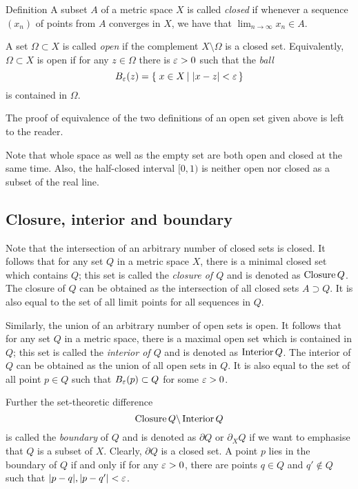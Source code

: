 \begin{thm}{Definition}
A subset $A$ of a metric space $X$ is called \emph{closed} if whenever a sequence $(x_n)$ of points from $A$ converges in $X$, we have that $\lim_{n\to\infty} x_n \in A$.

A set $\Omega \subset X$ is called \emph{open} if the complement $X \setminus \Omega$ is a closed set.
Equivalently, $\Omega \subset X$ is open if for any $z\in \Omega$ 
there is $\varepsilon>0$ such that the \emph{ball}
$$B_\eps(z)=\set{x\in X}{|x-z|<\eps}$$
is contained in $\Omega$.
\end{thm}


The proof of equivalence of the two definitions of an open set given above is left to the reader.

Note that whole space as well as the empty set are both open and closed at the same time.
Also, the half-closed interval $[0,1)$ is neither open nor closed as a subset of the real line.


\subsection*{Closure, interior and boundary}

Note that the intersection of an arbitrary number of closed sets is closed.
It follows that for any set $Q$ in a metric space $X$, there is a minimal closed set which contains $Q$;
this set is called the \emph{closure of $Q$} and is denoted as $\operatorname{Closure} Q$.
The closure of $Q$ can be obtained as the intersection of all closed sets $A\supset Q$.
It is also equal to the set of all limit points for all sequences in $Q$.


Similarly, the union of an arbitrary number of open sets is open.
It follows that for any set $Q$ in a metric space, there is a maximal open set which is contained in $Q$;
this set is called the \emph{interior of $Q$} and is denoted as $\operatorname{Interior} Q$.
The interior of $Q$ can be obtained as the union of all open sets in $Q$.
It is also equal to the set of all point $p\in Q$ such that $B_\varepsilon(p)\subset Q$ for some $\varepsilon>0$.

Further the set-theoretic difference
$$\operatorname{Closure} Q\backslash \operatorname{Interior} Q$$
is called the \emph{boundary} of $Q$ and is denoted as $\partial Q$ or $\partial_X Q$ if we want to emphasise that $Q$ is a subset of $X$.
Clearly, $\partial Q$ is a closed set.
A point $p$ lies in the boundary of $Q$ if and only if for any $\varepsilon>0$, there are points $q\in Q$ and $q'\notin Q$ such that $|p-q|,|p-q'|<\varepsilon$.

